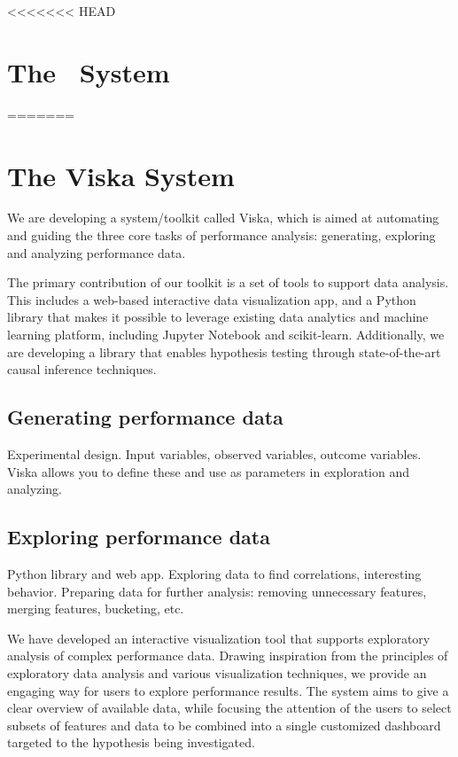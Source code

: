 <<<<<<< HEAD
\section{The \GSQL \ System}
=======
\section{The Viska System}

We are developing a system/toolkit called Viska, which is aimed at automating
and guiding the three core tasks of performance analysis: generating,
exploring and analyzing performance data.

The primary contribution of our toolkit is a set of tools to support
data analysis.
This includes a web-based interactive data visualization app, and a
Python library that makes it possible to leverage existing data
analytics and machine learning platform, including Jupyter Notebook
and scikit-learn.
Additionally, we are developing a
library that enables hypothesis testing through state-of-the-art causal inference
techniques. %

\subsection{Generating performance data}
Experimental design. Input variables, observed variables, outcome variables.
Viska allows you to define these and use as parameters in exploration and
analyzing.

\subsection{Exploring performance data}
Python library and web app. Exploring data to find correlations, interesting
behavior. Preparing data for further analysis: removing unnecessary features,
merging features, bucketing, etc.

We have developed an interactive visualization
tool that supports exploratory analysis of complex performance
data. Drawing inspiration from the principles of exploratory
data analysis and various visualization techniques,
we provide an engaging way for users to explore performance
results. The system aims to give a clear overview
of available data, while focusing the attention of the users to
select subsets of features and data to be combined into a single
customized dashboard targeted to the hypothesis being
investigated.

